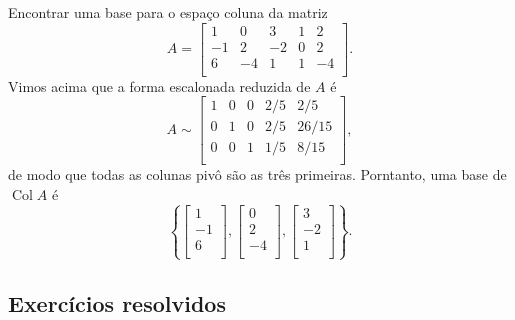 \documentclass[../livro.tex]{subfiles}  %
\begin{document}
\begin{example}
	Encontrar uma base para o espaço coluna da matriz
	\begin{equation}
	A = \left[
	\begin{array}{ccccc}
	1  & 0  & 3   & 1 & 2 \\
	-1 & 2  & -2  & 0 & 2 \\
	6  & -4 & 1   & 1 & -4 \\
	\end{array}
	\right].
	\end{equation} Vimos acima que a forma escalonada reduzida de $A$ é
	\begin{equation}
	A \sim
	\left[
	\begin{array}{ccccc}
	1  & 0  & 0  & 2/5 & 2/5  \\
	0  & 1  & 0  & 2/5 & 26/15  \\
	0  & 0  & 1  & 1/5 & 8/15 \\
	\end{array}
	\right],
	\end{equation} de modo que todas as colunas pivô são as três primeiras. Porntanto, uma base de $\operatorname{Col} A$ é
	\begin{equation}
	\left\{
	\left[
	\begin{array}{c}
	1    \\
	-1  \\
	6    \\
	\end{array}
	\right],
	\left[
	\begin{array}{c}
	0   \\
	2   \\
	-4   \\
	\end{array}
	\right],
	\left[
	\begin{array}{c}
	3  \\
	-2 \\
	1  \\
	\end{array}
	\right]
	\right\}.
	\end{equation}
\end{example}





\subsection*{Exercícios resolvidos}

\construirExeresol
\end{document}
